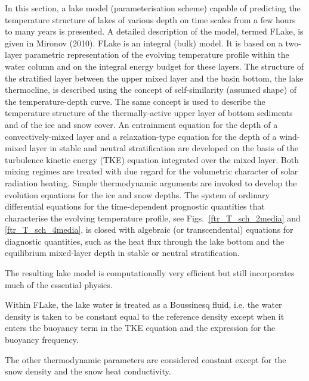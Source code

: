 \nopagebreak 
%
\noindent
In this section, a lake model (parameterisation scheme) capable of predicting the temperature structure
of lakes of various depth on time scales from a few hours to many years is presented.
A detailed description of the model, termed FLake, is given in Mironov (2010).
FLake is an integral (bulk) model.
It is based on a two-layer parametric representation of the evolving temperature profile within the water column
and on the integral energy budget for these layers.
The structure of the stratified layer between the upper mixed layer and the basin bottom, the lake thermocline,
is described using the concept of self-similarity (assumed shape) of the temperature-depth curve.
The same concept is used to describe the temperature structure
of the thermally-active upper layer of bottom sediments and of the ice and snow cover.
An entrainment equation for the depth of a convectively-mixed layer
and a relaxation-type equation for the depth of a wind-mixed layer
in stable and neutral stratification are developed
on the basis of the turbulence kinetic energy (TKE) equation integrated over the mixed layer.
Both mixing regimes are treated with due regard for the volumetric character of solar radiation heating.
Simple thermodynamic arguments are invoked to develop the evolution equations for the ice and snow depths.
The system of ordinary differential equations for the time-dependent prognostic quantities
that characterise the evolving temperature profile, see Figs.~\ref{ftr_T_sch_2media} and \ref{ftr_T_sch_4media}, is closed with algebraic (or transcendental) equations for diagnostic quantities,
such as the heat flux through the lake bottom and the equilibrium mixed-layer depth in stable or neutral stratification.

The resulting lake model is computationally very efficient but still incorporates much of the essential physics.

Within FLake, the lake water is treated as a Boussinesq fluid, i.e. the water density is taken to be constant equal
to the reference density except when it enters the buoyancy term in the TKE equation and the expression for the buoyancy frequency.

The other thermodynamic parameters are considered constant except for the snow density and the snow heat conductivity.

